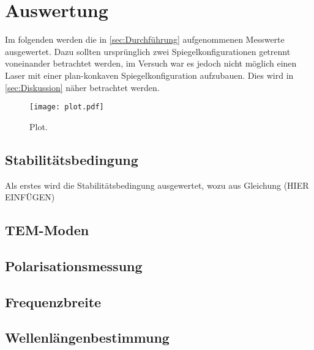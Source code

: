 \section{Auswertung}
\label{sec:Auswertung}
Im folgenden werden die in \autoref{sec:Durchführung} aufgenommenen Messwerte ausgewertet. Dazu sollten ursprünglich zwei Spiegelkonfigurationen getrennt
voneinander betrachtet werden, im Versuch war es jedoch nicht möglich einen Laser mit einer plan-konkaven Spiegelkonfiguration aufzubauen. Dies wird in \autoref{sec:Diskussion} näher betrachtet werden.


\begin{figure}
  \centering
  \texttt{[image: plot.pdf]}
  \caption{Plot.}
  \label{fig:plot}
\end{figure}



\subsection{Stabilitätsbedingung}
\label{subsec:Stabilitätsbedingung}
Als erstes wird die Stabilitätsbedingung ausgewertet, wozu aus Gleichung (HIER EINFÜGEN)


\subsection{TEM-Moden}
\label{subsec:TEM}


\subsection{Polarisationsmessung}
\label{subsec:Polarisationsmessung}

\subsection{Frequenzbreite}
\label{subsec:Frequenzbreite}


\subsection{Wellenlängenbestimmung}
\label{subsec:wellen}
